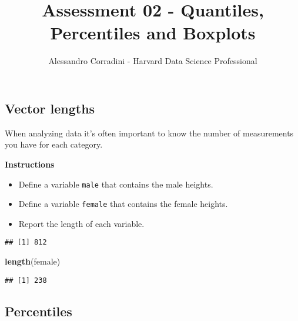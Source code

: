 \documentclass[]{article}
\title{Assessment 02 - Quantiles, Percentiles and Boxplots}
\author{Alessandro Corradini - Harvard Data Science Professional}
\date{}
\newenvironment{Shaded}{\begin{snugshade}}{\end{snugshade}}
\newcommand{\KeywordTok}[1]{\textcolor[rgb]{0.13,0.29,0.53}{\textbf{#1}}}
\newcommand{\StringTok}[1]{\textcolor[rgb]{0.31,0.60,0.02}{#1}}
\newcommand{\OperatorTok}[1]{\textcolor[rgb]{0.81,0.36,0.00}{\textbf{#1}}}
\newcommand{\NormalTok}[1]{#1}
\providecommand{\tightlist}{%
  \setlength{\itemsep}{0pt}\setlength{\parskip}{0pt}}
\begin{document}
\maketitle

\subsection{\texorpdfstring{\textbf{Vector
lengths}}{Vector lengths}}\label{vector-lengths}

When analyzing data it's often important to know the number of
measurements you have for each category.

\textbf{Instructions}

\begin{itemize}
\tightlist
\item
  Define a variable \texttt{male} that contains the male heights.
\item
  Define a variable \texttt{female} that contains the female heights.
\item
  Report the length of each variable.
\end{itemize}

\begin{Shaded}
\end{Shaded}

\begin{verbatim}
## [1] 812
\end{verbatim}

\begin{Shaded}
\begin{Highlighting}[]
\KeywordTok{length}\NormalTok{(female)}
\end{Highlighting}
\end{Shaded}

\begin{verbatim}
## [1] 238
\end{verbatim}

\subsection{\texorpdfstring{\textbf{Percentiles}}{Percentiles}}\label{percentiles}
\end{document}
